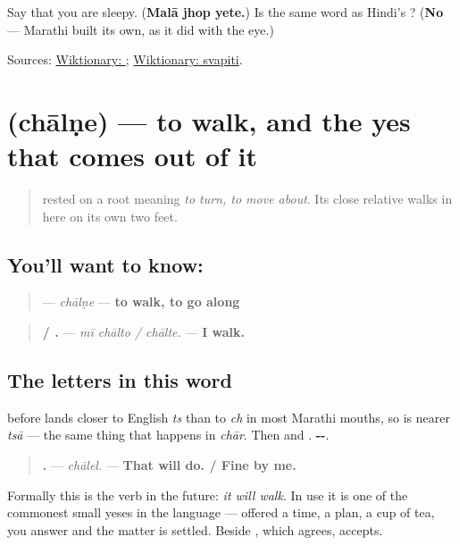 \begin{tcolorbox}[breakable,colback=teal!4,colframe=teal!35!black,title={Before you move on}]
Say that you are sleepy. (\textbf{Malā jhop yete.}) Is \textbf{} the same word as Hindi's \textbf{}? (\textbf{No} — Marathi built its own, as it did with the eye.)

Sources: \href{https://en.wiktionary.org/wiki/\%E0\%A4\%9D\%E0\%A5\%8B\%E0\%A4\%AA}{Wiktionary: }; \href{https://en.wiktionary.org/wiki/\%E0\%A4\%B8\%E0\%A5\%8D\%E0\%A4\%B5\%E0\%A4\%AA\%E0\%A4\%BF\%E0\%A4\%A4\%E0\%A4\%BF}{Wiktionary: svapiti}.
\end{tcolorbox}
\section[chālṇe]{ (chālṇe) — to walk, and the yes that comes out of it}

\label{lesson:MR-C23-chalne}



\begin{quote}
\textbf{} rested on a root meaning \emph{to turn, to move about}. Its close relative walks in here on its own two feet.
\end{quote}

\subsection*{You'll want to know: }
\begin{quote}
\textbf{} — \emph{chālṇe} — \textbf{to walk, to go along}
\end{quote}

\begin{quote}
\textbf{  / .} — \emph{mī chālto / chālte.} — \textbf{I walk.}
\end{quote}

\subsection*{The letters in this word}
\textbf{} before \textbf{} lands closer to English \emph{ts} than to \emph{ch} in most Marathi mouths, so \textbf{} is nearer \emph{tsā} — the same thing that happens in \emph{chār}. Then \textbf{} and \textbf{}. \textbf{--}.

\begin{grammarlens}[title={Grammar Lens: the yes that means it will walk}]
\begin{quote}
\textbf{.} — \emph{chālel.} — \textbf{That will do. / Fine by me.}
\end{quote}

Formally this is the verb in the future: \emph{it will walk}. In use it is one of the commonest small yeses in the language — offered a time, a plan, a cup of tea, you answer \textbf{} and the matter is settled. Beside \textbf{}, which agrees, \textbf{} accepts.
\end{grammarlens}

